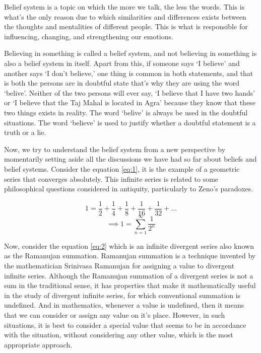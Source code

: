 Belief system is a topic on which the more we talk, the less the words. This is what's the only reason due to which similarities and differences exists between the thoughts and mentalities of different people. This is what is responsible for influencing, changing, and strengthening our emotions.

Believing in something is called a belief system, and not believing in something is also a belief system in itself. Apart from this, if someone says `I believe' and another says `I don't believe,' one thing is common in both statements, and that is both the persons are in doubtful state that's why they are using the word `belive'. Neither of the two persons will ever say, `I believe that I have two hands' or `I believe that the Taj Mahal is located in Agra' because they know that these two things exists in reality. The word `belive' is always be used in the doubtful situations. The word `believe' is used to justify whether a doubtful statement is a truth or a lie.

Now, we try to understand the belief system from a new perspective by momentarily setting aside all the discussions we have had so far about beliefs and belief systems. Consider the equation \ref{eq:1}, it is the example of a geometric series that converges absolutely. This infinite series is related to some philosophical questions considered in antiquity, particularly to Zeno's paradoxes\cite{enwiki:1123380424}.

\[1 = \dfrac{1}{2} + \dfrac{1}{4} + \dfrac{1}{8} + \dfrac{1}{16} + \dfrac{1}{32} + ...\]
\begin{equation}\label{eq:1}
	\implies\boxed{1 = \sum\limits_{n = 1}^\infty\dfrac{1}{2^n}}
\end{equation}

Now, consider the equation \ref{eq:2} which is an infinite divergent series also known as the Ramanujan summation. Ramanujan summation is a technique invented by the mathematician Srinivasa Ramanujan for assigning a value to divergent infinite series. Although the Ramanujan summation of a divergent series is not a sum in the traditional sense, it has properties that make it mathematically useful in the study of divergent infinite series, for which conventional summation is undefined\cite{enwiki:1148245424}. And in mathematics, whenever a value is undefined, then it means that we can consider or assign any value on it's place. However, in such situations, it is best to consider a special value that seems to be in accordance with the situation, without considering any other value, which is the most appropriate approach.

